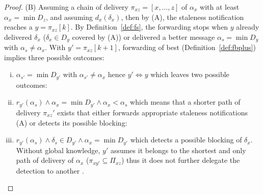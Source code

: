 \begin{proof}
  \noindent (B) Assuming a chain of delivery
  $\pi_{xz} = [x, \ldots, z]$ of $\alpha_x$ with at least
  $\alpha_x = \min D_z$, and assuming $d_x(\delta_x)$, then by (A),
  the staleness notification reaches a \process $ y = \pi_{xz}[k]$. By
  Definition~\ref{def:fs}, the forwarding stops when $y$ already
  delivered $\delta_x$ ($\delta_x \in D_y$ covered by (A)) or
  delivered a better message $\alpha_s = \min D_y$ with
  $\alpha_s \neq \alpha_x$. With $y'=\pi_{xz}[k+1]$, forwarding of
  best (Definition~\ref{def:fbplus}) implies three possible outcomes:
  \begin{enumerate}[(i)]
  \item $\alpha_{s'} = \min D_{y'}$ with $\alpha_{s'} \neq \alpha_x$
    hence $y' \iff y$ which leaves two possible outcomes:
  \item
    $r_{y'}(\alpha_s) \wedge \alpha_x = \min D_{y'} \wedge \alpha_x <
    \alpha_s$ which means that a shorter path of delivery $\pi_{xz}'$
    exists that either forwards appropriate staleness notifications
    (A) or detects its possible blocking:
  \item
    $r_{y'}(\alpha_s) \wedge \delta_s \in D_{y'} \wedge \alpha_x =
    \min D_{y'}$ which detects a possible blocking of
    $\delta_x$. Without global knowledge, $y'$ assumes it belongs to
    the shortest and only path of delivery of $\alpha_x$
    ($\pi_{xy'} \subseteq \Pi_{xz}$) thus it does not further delegate
    the detection to another \process.
  \end{enumerate} \vspace{-1.5em} %

\end{proof}
